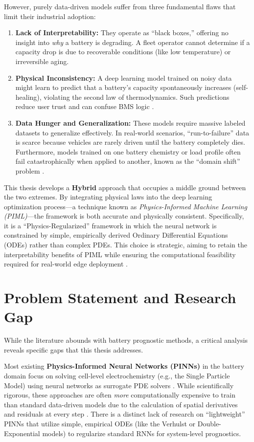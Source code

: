 However, purely data-driven models suffer from three fundamental flaws that limit their industrial adoption:
\begin{enumerate}
    \item \textbf{Lack of Interpretability:} They operate as ``black boxes,'' offering no insight into \textit{why} a battery is degrading. A fleet operator cannot determine if a capacity drop is due to recoverable conditions (like low temperature) or irreversible aging.
    \item \textbf{Physical Inconsistency:} A deep learning model trained on noisy data might learn to predict that a battery's capacity spontaneously increases (self-healing), violating the second law of thermodynamics. Such predictions reduce user trust and can confuse BMS logic \cite{ref1_general}.
    \item \textbf{Data Hunger and Generalization:} These models require massive labeled datasets to generalize effectively. In real-world scenarios, ``run-to-failure'' data is scarce because vehicles are rarely driven until the battery completely dies. Furthermore, models trained on one battery chemistry or load profile often fail catastrophically when applied to another, known as the ``domain shift'' problem \cite{hybridonet_adapt}.
\end{enumerate}

This thesis develops a \textbf{Hybrid} approach that occupies a middle ground between the two extremes. By integrating physical laws into the deep learning optimization process—a technique known as \textit{Physics-Informed Machine Learning (PIML)}—the framework is both accurate and physically consistent. Specifically, it is a ``Physics-Regularized'' framework in which the neural network is constrained by simple, empirically derived Ordinary Differential Equations (ODEs) rather than complex PDEs. This choice is strategic, aiming to retain the interpretability benefits of PIML while ensuring the computational feasibility required for real-world edge deployment \cite{jafari_cnn_gru}.

\section{Problem Statement and Research Gap}

While the literature abounds with battery prognostic methods, a critical analysis reveals specific gaps that this thesis addresses. 

Most existing \textbf{Physics-Informed Neural Networks (PINNs)} in the battery domain focus on solving cell-level electrochemistry (e.g., the Single Particle Model) using neural networks as surrogate PDE solvers \cite{wang_pinn}. While scientifically rigorous, these approaches are often \textit{more} computationally expensive to train than standard data-driven models due to the calculation of spatial derivatives and residuals at every step \cite{pine_survey}. There is a distinct lack of research on ``lightweight'' PINNs that utilize simple, empirical ODEs (like the Verhulst or Double-Exponential models) to regularize standard RNNs for system-level prognostics.

